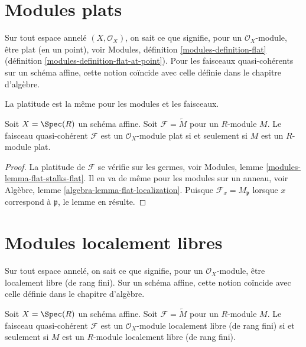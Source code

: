 \section{Modules plats}
\label{section-flat}

\noindent
Sur tout espace annelé $(X, \mathcal{O}_X)$,
on sait ce que signifie, pour un $\mathcal{O}_X$-module,
être plat (en un point), voir
Modules, définition \ref{modules-definition-flat}
(définition \ref{modules-definition-flat-at-point}).
Pour les faisceaux quasi-cohérents sur un schéma affine, cette notion coïncide
avec celle définie dans le chapitre d'algèbre.

\begin{lemma}
\label{lemma-flat-module}
\begin{slogan}
La platitude est la même pour les modules et les faisceaux.
\end{slogan}
Soit $X = \Spec(R)$ un schéma affine.
Soit $\mathcal{F} = \widetilde{M}$ pour un $R$-module $M$.
Le faisceau quasi-cohérent $\mathcal{F}$ est un
$\mathcal{O}_X$-module plat si et seulement si $M$ est un $R$-module plat.
\end{lemma}

\begin{proof}
La platitude de $\mathcal{F}$ se vérifie sur les germes, voir
Modules, lemme \ref{modules-lemma-flat-stalks-flat}.
Il en va de même pour les modules sur un anneau, voir
Algèbre, lemme \ref{algebra-lemma-flat-localization}.
Puisque $\mathcal{F}_x = M_{\mathfrak p}$ lorsque $x$ correspond
à $\mathfrak p$, le lemme en résulte.
\end{proof}

\section{Modules localement libres}
\label{section-finite-locally-free}

\noindent
Sur tout espace annelé, on sait ce que signifie, pour un $\mathcal{O}_X$-module,
être localement libre (de rang fini). Sur un schéma affine, cette notion coïncide
avec celle définie dans le chapitre d'algèbre.

\begin{lemma}
\label{lemma-locally-free-module}
Soit $X = \Spec(R)$ un schéma affine.
Soit $\mathcal{F} = \widetilde{M}$ pour un $R$-module $M$.
Le faisceau quasi-cohérent $\mathcal{F}$ est un
$\mathcal{O}_X$-module localement libre (de rang fini) si et seulement si $M$ est un
$R$-module localement libre (de rang fini).
\end{lemma}

